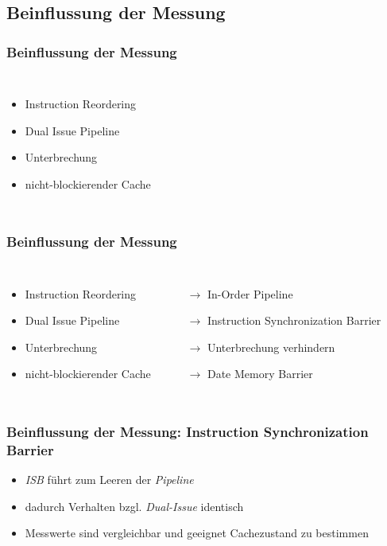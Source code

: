 \documentclass{beamer}
\begin{document}
\subsection{Beinflussung der Messung}
\begin{frame}
\frametitle{Beinflussung der Messung}
\begin{columns}[c]
\begin{itemize}
	\item Instruction Reordering
	\item Dual Issue Pipeline
	\item Unterbrechung
	\item nicht-blockierender Cache
\end{itemize}
\end{columns}
\end{frame}

\begin{frame}
\frametitle{Beinflussung der Messung}
\begin{columns}[c]
\begin{itemize}
	\item Instruction Reordering
	\item Dual Issue Pipeline
	\item Unterbrechung
	\item nicht-blockierender Cache
\end{itemize}
\begin{itemize}
	\item[$\rightarrow$] \textcolor{black!50!green}{In-Order Pipeline}
	\item[$\rightarrow$] \textcolor{black!50!green}{Instruction Synchronization Barrier}
	\item[$\rightarrow$] \textcolor{black!50!green}{Unterbrechung verhindern}
	\item[$\rightarrow$] \textcolor{black!50!green}{Date Memory Barrier}
\end{itemize}
\end{columns}
\end{frame}

\begin{frame}
\frametitle{Beinflussung der Messung: Instruction Synchronization Barrier}
\begin{itemize}
	\item \textit{ISB} führt zum Leeren der \textit{Pipeline}
	\item dadurch Verhalten bzgl. \textit{Dual-Issue} identisch
	\item Messwerte sind vergleichbar und geeignet Cachezustand zu bestimmen
\end{itemize}
\end{frame}
\end{document}
